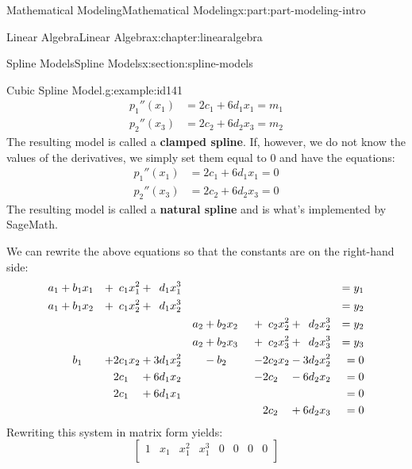 \documentclass[oneside,10pt,]{book}
\newcommand{\terminology}[1]{\textbf{#1}}
\numberwithin{equation}{section}
\newcommand{\amp}{&}
\begin{document}
\begin{partptx}{Mathematical Modeling}{}{Mathematical Modeling}{}{}{x:part:part-modeling-intro}
\begin{chapterptx}{Linear Algebra}{}{Linear Algebra}{}{}{x:chapter:linearalgebra}
\begin{sectionptx}{Spline Models}{}{Spline Models}{}{}{x:section:spline-models}
\begin{example}{Cubic Spline Model.}{g:example:id141}
\begin{equation*}
\begin{aligned}
p_1''(x_1) \amp= 2c_1 + 6d_1 x_1 = m_1 \\
p_2''(x_3) \amp= 2c_2 + 6d_2 x_3 = m_2
\end{aligned}
\end{equation*}
The resulting model is called a \terminology{clamped spline}. If, however, we do not know the values of the derivatives, we simply set them equal to 0 and have the equations:%
%
\begin{equation*}
\begin{aligned}
p_1''(x_1) \amp= 2c_1 + 6d_1 x_1 = 0 \\
p_2''(x_3) \amp= 2c_2 + 6d_2 x_3 = 0
\end{aligned}
\end{equation*}
The resulting model is called a \terminology{natural spline} and is what's implemented by SageMath.%
\par
We can rewrite the above equations so that the constants are on the right-hand side:%
%
\begin{equation*}
\begin{aligned}
a_1 \amp + b_1 x_1 \amp + \hphantom{3}c_1 x_1^2 \amp + \hphantom{3}d_1 x_1^3 \amp \amp \amp \amp \amp = y_1 \\
a_1 \amp + b_1 x_2 \amp + \hphantom{3}c_1 x_2^2 \amp + \hphantom{3}d_1 x_2^3 \amp \amp \amp \amp \amp = y_2 \\
\amp \amp \amp \amp a_2 \amp + b_2 x_2 \amp + \hphantom{3}c_2 x_2^2 \amp + \hphantom{3}d_2 x_2^3 \amp  = y_2 \\
\amp \amp \amp \amp a_2 \amp + b_2 x_3 \amp + \hphantom{3}c_2 x_3^2 \amp + \hphantom{3}d_2 x_3^3 \amp  = y_3 \\
\amp \hphantom{{}+{}}b_1 \amp + 2c_1 x_2 \amp + 3d_1 x_2^2 \amp \amp -b_2 \amp - 2c_2 x_2 \amp - 3d_2 x_2^2 \amp = 0 \\
\amp \amp 2c_1\hphantom{x_2} \amp + 6d_1x_2 \amp \amp \amp -2c_2\hphantom{x_2} \amp -6d_2 x_2 \amp = 0 \\
\amp \amp 2c_1\hphantom{x_1} \amp + 6d_1x_1 \amp \amp \amp  \amp \amp = 0 \\
\amp \amp \amp \amp \amp \amp \hphantom{{}-{}}2c_2\hphantom{x_2} \amp +6d_2 x_3 \amp = 0
\end{aligned}
\end{equation*}
Rewriting this system in matrix form yields:%
%
\begin{equation*}
\begin{bmatrix}
1 \amp x_1 \amp x_1^2 \amp x_1^3 \amp 0 \amp 0 \amp 0\amp 0 \\

\end{bmatrix}
\end{equation*}
\end{example}
\end{sectionptx}
\end{chapterptx}
\end{partptx}
\end{document}
